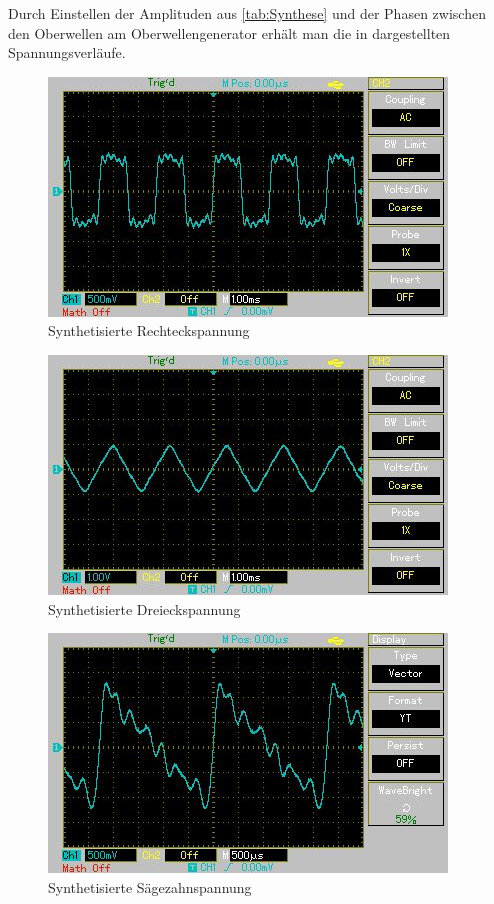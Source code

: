   

Durch Einstellen der Amplituden aus \cref{tab:Synthese} und der Phasen zwischen den Oberwellen am Oberwellengenerator
erhält man die in  dargestellten Spannungsverläufe.

\begin{figure}[h!]
	\centering
	\includegraphics[scale=0.8]{Grafiken/Rechteckspannung.jpg}
	\caption{Synthetisierte Rechteckspannung}
	\label{fig:Recht}
\end{figure}

\begin{figure}[h!]
	\centering
	\includegraphics[scale=0.8]{Grafiken/Dreieckspannung.jpg}
	\caption{Synthetisierte Dreieckspannung}
	\label{fig:Drei}
\end{figure}

\begin{figure}[h!]
	\centering
	\includegraphics[scale=0.8]{Grafiken/Saegezahnspannung.jpg}
	\caption{Synthetisierte Sägezahnspannung}	
	\label{fig:Säge}
\end{figure}